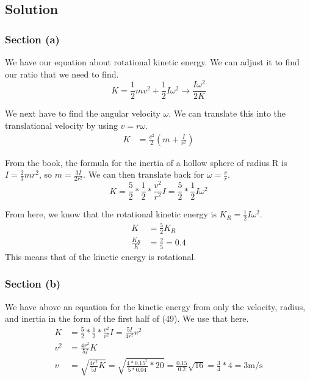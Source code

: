 \documentclass[12pt]{article}
\begin{document}
\subsection{Solution}
\subsubsection{Section (a)}
We have our equation about rotational kinetic energy. We can adjust it to find our ratio that we need to find. 
\begin{equation}
    K   =   \frac{1}{2}mv^2 + \frac{1}{2}I\omega^2
    \rightarrow \frac{I\omega^2}{2K}
\end{equation}

We next have to find the angular velocity $\omega$. We can translate this into the translational velocity by using \(v = r\omega\). 
\begin{align}
    K   &=  \frac{v^2}{2}\left(m + \frac{I}{r^2}\right)
\end{align}

From the book, the formula for the inertia of a hollow sphere of radius R is \(I = \frac{2}{3}mr^2\), so \(m = \frac{3I}{2r^2}\). We can then translate back for \(\omega =\frac{v}{r}\).
\begin{equation}
    K   =   \frac{5}{2}*\frac{1}{2}*\frac{v^2}{r^2}I
        =   \frac{5}{2}*\frac{1}{2}I\omega^2
\end{equation}

From here, we know that the rotational kinetic energy is \(K_R = \frac{1}{2}I\omega^2\).
\begin{align}
    K   &=  \frac{5}{2}K_R\\
    \frac{K_R}{K} &= \frac{2}{5} = 0.4
\end{align}
This means that  of the kinetic energy is rotational. 

\subsubsection{Section (b)}
We have above an equation for the kinetic energy from only the velocity, radius, and inertia in the form of the first half of (49). We use that here. 
\begin{align}
    K   &=  \frac{5}{2}*\frac{1}{2}*\frac{v^2}{r^2}I
        =   \frac{5I}{4r^2}v^2\\
    v^2 &=  \frac{4r^2}{5I}K\\
    v   &=  \sqrt{\frac{4r^2}{5I}K}
        =   \sqrt{\frac{4*0.15^2}{5*0.04}*20}
        =   \frac{0.15}{0.2}\sqrt{16}
        =   \frac{3}{4}*4
        =   \boxed{3\unit{\meter/\second}}
\end{align}
\end{document}
